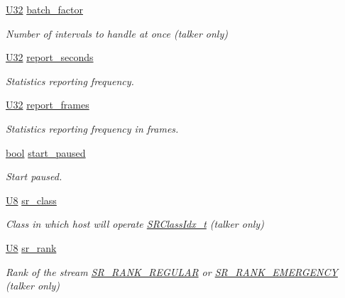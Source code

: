 \begin{DoxyCompactItemize}
\item 
\hyperlink{openavb__types__base__pub_8h_a696390429f2f3b644bde8d0322a24124}{U32} \hyperlink{structopenavb__tl__cfg__t_a9db3c945c8e429a9ca8e13db38447d3c}{batch\+\_\+factor}
\begin{DoxyCompactList}\small\item\em Number of intervals to handle at once (talker only) \end{DoxyCompactList}\item 
\hyperlink{openavb__types__base__pub_8h_a696390429f2f3b644bde8d0322a24124}{U32} \hyperlink{structopenavb__tl__cfg__t_aa421113dd03391cac7220cd7dd7ee59b}{report\+\_\+seconds}
\begin{DoxyCompactList}\small\item\em Statistics reporting frequency. \end{DoxyCompactList}\item 
\hyperlink{openavb__types__base__pub_8h_a696390429f2f3b644bde8d0322a24124}{U32} \hyperlink{structopenavb__tl__cfg__t_a7b201beeb969583c11c16d83be758959}{report\+\_\+frames}
\begin{DoxyCompactList}\small\item\em Statistics reporting frequency in frames. \end{DoxyCompactList}\item 
\hyperlink{avb__gptp_8h_af6a258d8f3ee5206d682d799316314b1}{bool} \hyperlink{structopenavb__tl__cfg__t_a0983af523b1f3fd4392c902ccf862905}{start\+\_\+paused}
\begin{DoxyCompactList}\small\item\em Start paused. \end{DoxyCompactList}\item 
\hyperlink{openavb__types__base__pub_8h_aa63ef7b996d5487ce35a5a66601f3e73}{U8} \hyperlink{structopenavb__tl__cfg__t_a39d4e73b306d801de38536c43ef7a5e8}{sr\+\_\+class}
\begin{DoxyCompactList}\small\item\em Class in which host will operate \hyperlink{openavb__types__base__pub_8h_a4d8ccbeaf8ad040d8880e8971fc62752}{S\+R\+Class\+Idx\+\_\+t} (talker only) \end{DoxyCompactList}\item 
\hyperlink{openavb__types__base__pub_8h_aa63ef7b996d5487ce35a5a66601f3e73}{U8} \hyperlink{structopenavb__tl__cfg__t_aec168f739a62e7d1167959b587d0a50b}{sr\+\_\+rank}
\begin{DoxyCompactList}\small\item\em Rank of the stream \hyperlink{openavb__types__base__pub_8h_ae2247245210ff7d9b305530e79921b04}{S\+R\+\_\+\+R\+A\+N\+K\+\_\+\+R\+E\+G\+U\+L\+AR} or \hyperlink{openavb__types__base__pub_8h_afc788727fb40393561024641cee8f6c8}{S\+R\+\_\+\+R\+A\+N\+K\+\_\+\+E\+M\+E\+R\+G\+E\+N\+CY} (talker only) \end{DoxyCompactList}\item 

\end{DoxyCompactItemize}
